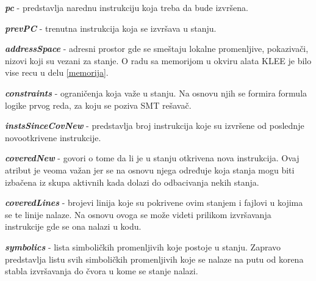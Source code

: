 \documentclass[12pt,oneside]{memoir}
\begin{document}
\begin{description}
    \item \textbf{\textit{pc}} - predstavlja narednu instrukciju koja treba da bude izvršena.
    
    \item \textbf{\textit{prevPC}} - trenutna instrukcija koja se izvršava u stanju.
    
    \item \textbf{\textit{addressSpace}} - adresni prostor gde se smeštaju lokalne promenljive, pokazivači, nizovi koji su vezani za stanje. O radu sa memorijom u okviru alata KLEE je bilo vise recu u delu \ref{memorija}.
    
    \item \textbf{\textit{constraints}} - ograničenja koja važe u stanju. Na osnovu njih se formira formula logike prvog reda, za koju se poziva SMT rešavač.
    
    \item \textbf{\textit{instsSinceCovNew}} - predstavlja broj instrukcija koje su izvršene od poslednje novootkrivene instrukcije.
    
    \item \textbf{\textit{coveredNew}} - govori o tome da li je u stanju otkrivena nova instrukcija. Ovaj atribut je veoma važan jer se na osnovu njega određuje koja stanja mogu biti izbačena iz skupa aktivnih kada dolazi do odbacivanja nekih stanja.
    
    \item \textbf{\textit{coveredLines}} - brojevi linija koje su pokrivene ovim stanjem i fajlovi u kojima se te linije nalaze. Na osnovu ovoga se može videti prilikom izvršavanja instrukcije gde se ona nalazi u kodu.
    
    \item \textbf{\textit{symbolics}} - lista simboličkih promenljivih koje postoje u stanju. Zapravo predstavlja listu svih simboličkih promenljivih koje se nalaze na putu od korena stabla izvršavanja do čvora u kome se stanje nalazi.
\end{description}
\end{document}
